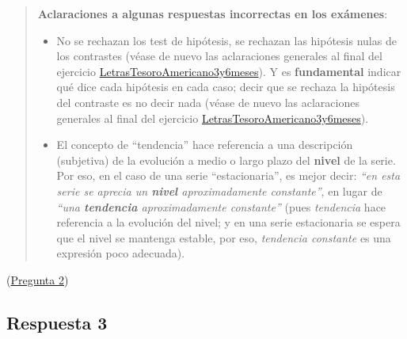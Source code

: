 \documentclass[10pt]{article}
\begin{document}
\begin{quote}
\textbf{Aclaraciones a algunas respuestas incorrectas en los exámenes}:

\begin{itemize}
\item No se rechazan los test de hipótesis, se rechazan las hipótesis
nulas de los contrastes (véase de nuevo las aclaraciones generales
al final del ejercicio \href{https://mbujosab.github.io/EconometriaAplicada-SRC/Ejercicios/LetrasTesoroAmericano3y6meses.html\#outline-container-org96e4dfc}{LetrasTesoroAmericano3y6meses}). Y es
\textbf{fundamental} indicar qué dice cada hipótesis en cada caso; decir
que se rechaza la hipótesis del contraste es no decir nada (véase de
nuevo las aclaraciones generales al final del ejercicio
\href{https://mbujosab.github.io/EconometriaAplicada-SRC/Ejercicios/LetrasTesoroAmericano3y6meses.html\#outline-container-org96e4dfc}{LetrasTesoroAmericano3y6meses}).
\end{itemize}



\begin{itemize}
\item El concepto de ``tendencia'' hace referencia a una descripción
(subjetiva) de la evolución a medio o largo plazo del \textbf{nivel} de la
serie. Por eso, en el caso de una serie ``estacionaria'', es mejor
decir: \emph{``en esta serie se aprecia un \textbf{nivel} aproximadamente
constante''}, en lugar de \emph{``una \textbf{tendencia} aproximadamente
constante''} (pues \emph{tendencia} hace referencia a la evolución del
nivel; y en una serie estacionaria se espera que el nivel se
mantenga estable, por eso, \emph{tendencia constante} es una expresión
poco adecuada).
\end{itemize}
\end{quote}


(\hyperref[sec:orgcdf1092]{Pregunta 2})
\subsection*{Respuesta 3}
\label{sec:orgbb1303e}
\end{document}
